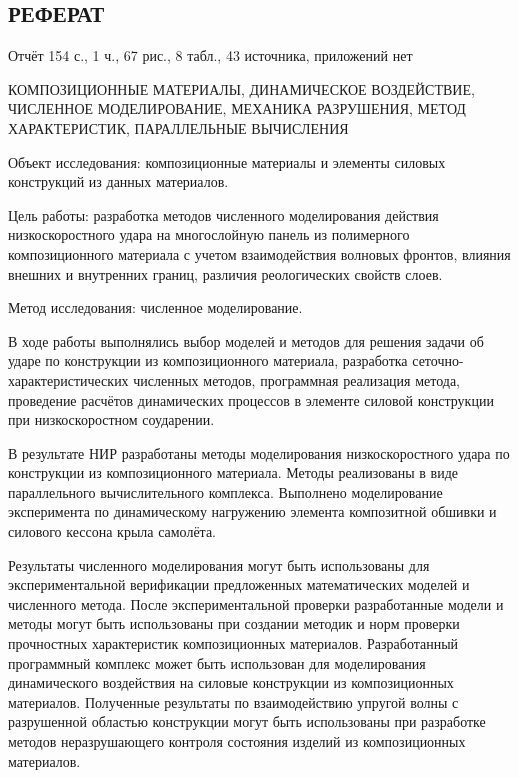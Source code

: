 \begin{center}\section*{РЕФЕРАТ}\end{center}

Отчёт 154 с., 1 ч., 67 рис., 8 табл., 43 источника, приложений нет

КОМПОЗИЦИОННЫЕ МАТЕРИАЛЫ, ДИНАМИЧЕСКОЕ ВОЗДЕЙСТВИЕ, ЧИСЛЕННОЕ МОДЕЛИРОВАНИЕ, МЕХАНИКА РАЗРУШЕНИЯ, МЕТОД ХАРАКТЕРИСТИК, ПАРАЛЛЕЛЬНЫЕ ВЫЧИСЛЕНИЯ

Объект исследования: композиционные материалы и элементы силовых конструкций из данных материалов.

Цель работы: разработка методов численного моделирования действия низкоскоростного удара на многослойную панель из полимерного композиционного материала с учетом взаимодействия волновых фронтов, влияния внешних и внутренних границ, различия реологических свойств слоев.

Метод исследования: численное моделирование.

В ходе работы выполнялись выбор моделей и методов для решения задачи об ударе по конструкции из композиционного материала, разработка сеточно-характеристических численных методов, программная реализация метода, проведение расчётов динамических процессов в элементе силовой конструкции при низкоскоростном соударении.

В результате НИР разработаны методы моделирования низкоскоростного удара по конструкции из композиционного материала. Методы реализованы в виде параллельного вычислительного комплекса. Выполнено моделирование эксперимента по динамическому нагружению элемента композитной обшивки и силового кессона крыла самолёта. 

Результаты численного моделирования могут быть использованы для экспериментальной верификации предложенных математических моделей и численного метода. После экспериментальной проверки разработанные модели и методы могут быть использованы при создании методик и норм проверки прочностных характеристик композиционных материалов. Разработанный программный комплекс может быть использован для моделирования динамического воздействия на силовые конструкции из композиционных материалов. Полученные результаты по взаимодействию упругой волны с разрушенной областью конструкции могут быть использованы при разработке методов неразрушающего контроля состояния изделий из композиционных материалов.
